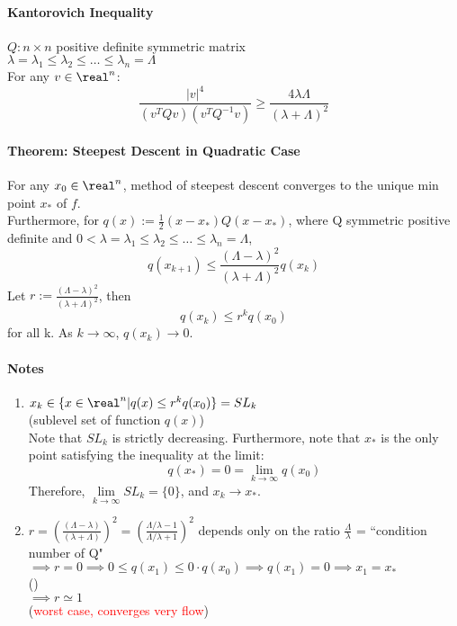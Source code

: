 \documentclass[11pt]{article}
\begin{document}
\paragraph{Kantorovich Inequality}
$Q: n\times n$ positive definite symmetric matrix \\
$\lambda = \lambda_1 \leq \lambda_2 \leq \hdots \leq \lambda_n = \Lambda$ \\
For any $v \in \real^n$:
$$ \frac{|v|^4}{(v^TQv)(v^TQ^{-1}v)} \geq \frac{4\lambda \Lambda}{(\lambda + \Lambda)^2} $$


\paragraph{Theorem: Steepest Descent in Quadratic Case}
For any $x_0 \in \real^n$, method of steepest descent converges to the unique min point $x_*$ of $f$. \\
Furthermore, for $q(x) := \frac{1}{2} (x - x_*) Q (x - x_*)$, where Q symmetric positive definite and $0 < \lambda = \lambda_1 \leq \lambda_2 \leq \hdots \leq \lambda_n = \Lambda$,  $$q(x_{k+1}) \leq \frac{(\Lambda - \lambda)^2}{(\lambda + \Lambda)^2} q(x_k)$$
Let $r := \frac{(\Lambda - \lambda)^2}{(\lambda + \Lambda)^2}$, then
$$q(x_k) \leq r^k q(x_0)$$ for all k. As $k \rightarrow \infty$, $q(x_k) \rightarrow 0$.

\paragraph{Notes}
\begin{enumerate}
	\item $x_k \in \{ x \in \real^n| q(x) \leq r^k q(x_0)\} = SL_k$\\ (sublevel set of function $q(x)$)\\
	Note that $SL_k$ is strictly decreasing. Furthermore, note that $x_*$ is the only point satisfying the inequality at the limit:
	$$q(x_*) = 0 = \underset{k \rightarrow \infty}{\lim} q(x_0)$$
	Therefore, $\underset{k \rightarrow \infty}{\lim} SL_k = \{0\}$, and $x_k \rightarrow x_*$. 
	\item $r = (\frac{(\Lambda - \lambda)}{(\lambda + \Lambda)})^2 = (\frac{\Lambda / \lambda - 1}{\Lambda / \lambda + 1})^2$ depends only on the ratio $\frac{\Lambda}{\lambda}$ = ``condition number of Q" \\
	$\implies r = 0 \implies 0 \leq q(x_1) \leq 0\cdot q(x_0) \implies q(x_1) = 0 \implies x_1 = x_*$\\
	()\\
	 $\implies r \simeq 1$ \\(\textcolor{red}{worst case, converges very flow})
\end{enumerate}
\end{document}
